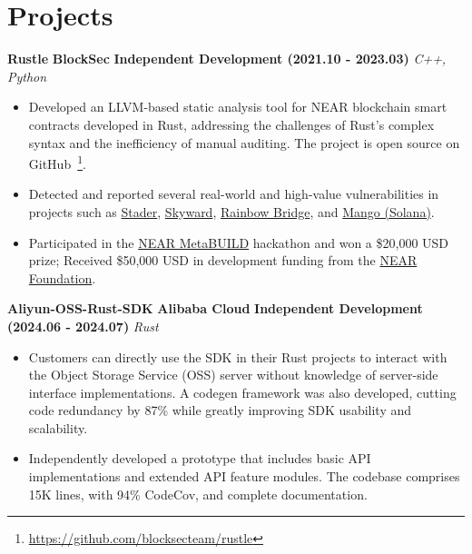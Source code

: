 \ifdefined\english

    \section*{Projects}

    \noindent \textbf{Rustle} \textbar{} \textbf{BlockSec} \textbar{} \textbf{Independent Development (2021.10 - 2023.03)} \hfill \textsl{C++, Python}

    \begin{itemize}
        \item Developed an LLVM-based static analysis tool for NEAR blockchain smart contracts developed in Rust, addressing the challenges of Rust's complex syntax and the inefficiency of manual auditing. The project is open source on GitHub~\footnote{\url{https://github.com/blocksecteam/rustle}}.
        \item Detected and reported several real-world and high-value vulnerabilities in projects such as \href{https://blog.staderlabs.com/stader-near-incident-report-08-16-2022-afe077ffd549}{Stader}, \href{https://coinculture.com/au/business/skyward-finance-reportedly-suffers-3m-exploit-on-near-protocol/}{Skyward}, \href{https://cryptopotato.com/defi-crisis-averted-near-protocols-rainbow-bridge-attacker-loses-2-5-eth/}{Rainbow Bridge}, and \href{https://blog.perp.fi/dissecting-the-mango-exploit-how-risk-is-mitigated-on-perp-v2-eccc91987c91}{Mango (Solana)}.
        \item Participated in the \href{https://devpost.com/software/rustle}{NEAR MetaBUILD} hackathon and won a \$20,000 USD prize; Received \$50,000 USD in development funding from the \href{https://near.foundation}{NEAR Foundation}.
    \end{itemize}

    \noindent \textbf{Aliyun-OSS-Rust-SDK} \textbar{} \textbf{Alibaba Cloud} \textbar{} \textbf{Independent Development (2024.06 - 2024.07)} \hfill \textsl{Rust}

    \begin{itemize}
        \item Customers can directly use the SDK in their Rust projects to interact with the Object Storage Service (OSS) server without knowledge of server-side interface implementations. A codegen framework was also developed, cutting code redundancy by 87\% while greatly improving SDK usability and scalability.
        \item Independently developed a prototype that includes basic API implementations and extended API feature modules. The codebase comprises 15K lines, with 94\% CodeCov, and complete documentation.
    \end{itemize}

